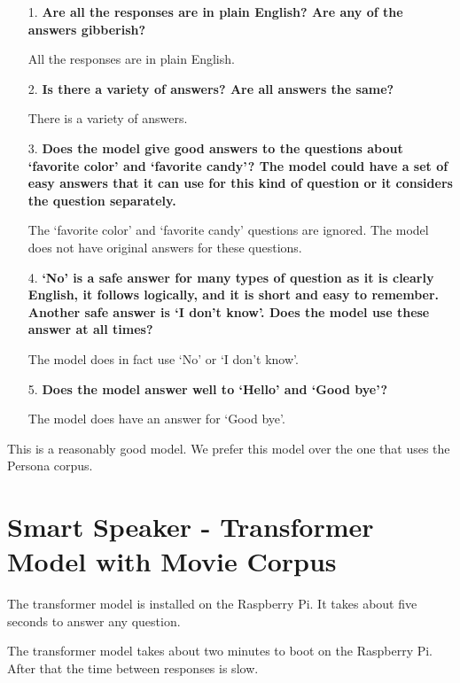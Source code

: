 \begin{itemize}
	\item [1.] \textbf{Are all the responses are in plain English? Are any of the answers gibberish?}
	
	\item []All the responses are in plain English. 
	
	\item [2.] \textbf{Is there a  variety of answers? Are all answers the same?}
	
	\item []There is a variety of answers. 
	
	\item [3.] \textbf{Does the model give good answers to the questions about `favorite color' and `favorite candy'? The model could have a set of easy answers that it can use for this kind of question or it considers the question separately. }
	
	\item []The `favorite color' and `favorite candy' questions are ignored. The model does not have original answers for these questions.
	
	\item [4.] \textbf{`No' is a safe answer for many types of question as it is clearly English, it follows logically, and it is short and easy to remember. Another safe answer is `I don't know'. Does the model use these answer at all times?}
	
	\item []The model does in fact use `No' or `I don't know'. 
	
	\item [5.] \textbf{Does the model answer well to `Hello' and `Good bye'?}
	
	\item []The model does have an answer for `Good bye'.
\end{itemize}

This is a reasonably good model. We prefer this model over the one that uses the Persona corpus.

\section{Smart Speaker - Transformer Model with Movie Corpus}

The transformer model is installed on the Raspberry Pi. It takes about five seconds to answer any question.

The transformer model takes about two minutes to boot on the Raspberry Pi. After that the time between responses is slow. 

